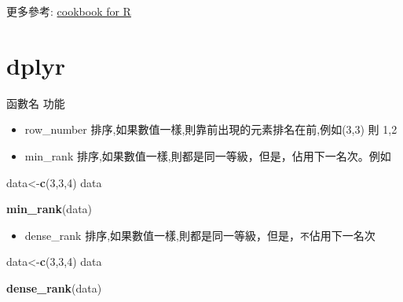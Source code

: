 \documentclass[]{book}
\newenvironment{Shaded}{\begin{snugshade}}{\end{snugshade}}
\newcommand{\DecValTok}[1]{\textcolor[rgb]{0.00,0.00,0.81}{#1}}
\newcommand{\KeywordTok}[1]{\textcolor[rgb]{0.13,0.29,0.53}{\textbf{#1}}}
\newcommand{\NormalTok}[1]{#1}
\providecommand{\tightlist}{%
  \setlength{\itemsep}{0pt}\setlength{\parskip}{0pt}}
\theoremstyle{definition}
\theoremstyle{definition}
\theoremstyle{definition}
\theoremstyle{remark}
\begin{document}
更多參考:
\href{http://www.cookbook-r.com/Manipulating_data/Converting_data_between_wide_and_long_format/}{cookbook
for R}

\hypertarget{dplyr}{%
\section{dplyr}\label{dplyr}}

函數名 功能

\begin{itemize}
\item
  row\_number 排序,如果數值一樣,則靠前出現的元素排名在前,例如(3,3) 則
  1,2
\item
  min\_rank 排序,如果數值一樣,則都是同一等級，但是，佔用下一名次。例如
\end{itemize}

\begin{Shaded}
\begin{Highlighting}[]
\NormalTok{data<-}\KeywordTok{c}\NormalTok{(}\DecValTok{3}\NormalTok{,}\DecValTok{3}\NormalTok{,}\DecValTok{4}\NormalTok{)  }
\NormalTok{data}
\end{Highlighting}
\end{Shaded}

\begin{Shaded}
\begin{Highlighting}[]
\KeywordTok{min_rank}\NormalTok{(data)}
\end{Highlighting}
\end{Shaded}

\begin{itemize}
\tightlist
\item
  dense\_rank
  排序,如果數值一樣,則都是同一等級，但是，\texttt{不}佔用下一名次
\end{itemize}

\begin{Shaded}
\begin{Highlighting}[]
\NormalTok{data<-}\KeywordTok{c}\NormalTok{(}\DecValTok{3}\NormalTok{,}\DecValTok{3}\NormalTok{,}\DecValTok{4}\NormalTok{)  }
\NormalTok{data}
\end{Highlighting}
\end{Shaded}

\begin{Shaded}
\begin{Highlighting}[]
\KeywordTok{dense_rank}\NormalTok{(data)}
\end{Highlighting}
\end{Shaded}
\end{document}

